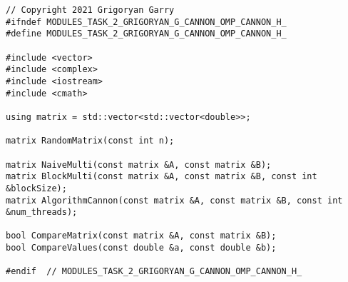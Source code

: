 \documentclass{report}
\begin{document}
\begin{lstlisting}
// Copyright 2021 Grigoryan Garry
#ifndef MODULES_TASK_2_GRIGORYAN_G_CANNON_OMP_CANNON_H_
#define MODULES_TASK_2_GRIGORYAN_G_CANNON_OMP_CANNON_H_

#include <vector>
#include <complex>
#include <iostream>
#include <cmath>

using matrix = std::vector<std::vector<double>>;

matrix RandomMatrix(const int n);

matrix NaiveMulti(const matrix &A, const matrix &B);
matrix BlockMulti(const matrix &A, const matrix &B, const int &blockSize);
matrix AlgorithmCannon(const matrix &A, const matrix &B, const int &num_threads);

bool CompareMatrix(const matrix &A, const matrix &B);
bool CompareValues(const double &a, const double &b);

#endif  // MODULES_TASK_2_GRIGORYAN_G_CANNON_OMP_CANNON_H_

\end{lstlisting}
\end{document}
